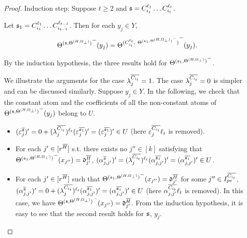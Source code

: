 \begin{appendix}
\begin{proof}
Induction step: Suppose $t \ge 2$ and ${\mathfrak{s} }=C^{\ell_1}_{i_1} \dots C^{\ell_t}_{i_t}$.

Let ${\mathfrak{s} }_1= C^{\ell_1}_{i_1} \dots C^{\ell_{t-1}}_{i_{t-1}}$.  Then for each $y_j \in Y$, 
\[{\Theta^{({\mathfrak{s} },\Theta^{(H,\Omega_\bot)})}}^-(y_j)=
{\Theta^{(C^{\ell_t}_{i_t},\ {\Theta^{({\mathfrak{s} }_1, \Theta^{(H,\Omega_\bot)})}}^-)}}^-(y_j).\] 

By the induction hypothesis, the three results hold for ${\Theta^{({\mathfrak{s} }_1, \Theta^{(H,\Omega_\bot)})}}^-$.

We illustrate the arguments for the case $\lambda^{\overline{C_{i_t}}}_{j} = 1$. The case $\lambda^{\overline{C_{i_t}}}_{j} = 0$ is simpler and can be discussed similarly. Suppose $y_j \in Y$.  In the following, we check that the constant atom and the coefficients of all the non-constant atoms of ${\Theta^{({\mathfrak{s} },\Theta^{(H,\Omega_\bot)})}}^-(y_j)$ belong to $U$.  
\begin{itemize}
	\item $(\varepsilon^{\overline{{\mathfrak{s} }}}_{j})' = 0 + (\lambda^{\overline{C_{i_t}}}_{j})^{\ell_t} (\varepsilon^{\overline{{\mathfrak{s} }_1}}_j)' = (\varepsilon^{\overline{{\mathfrak{s} }_1}}_j)' \in U$ (here $\varepsilon^{\overline{C_{i_t}}}_{j} \ell_t$ is removed).
	\item For each $j' \in [r^{\overline{H}}]$ s.t. there exists no $j'' \in [k]$ satisfying that ${\Theta^{({\mathfrak{s} }_1,\Theta^{(H,\Omega_\bot)})}}^-(x_{j''})=\mathfrak{d}^{\overline{H}}_{j'}$, $(\alpha^{\overline{{\mathfrak{s} }}}_{j, j'})' = (\lambda^{\overline{C_{i_t}}}_{j})^{\ell_t} (\alpha^{\overline{{\mathfrak{s} }_1}}_{j, j'})' = (\alpha^{\overline{{\mathfrak{s} }_1}}_{j, j'})' \in U$.
	\item For each $j' \in [r^{\overline{H}}]$ such that ${\Theta^{({\mathfrak{s} }_1,\Theta^{(H,\Omega_\bot)})}}^-(x_{j''})=\mathfrak{d}^{\overline{H}}_{j'}$ for some $j''  \in I^{\overline{C_{i_t}}}_{pe}$, $(\alpha^{\overline{{\mathfrak{s} }}}_{j, j'})' = 0 + (\lambda^{\overline{C_{i_t}}}_{j})^{\ell_t} (\alpha^{\overline{{\mathfrak{s} }_1}}_{j, j'})'= (\alpha^{\overline{{\mathfrak{s} }_1}}_{j, j'})' \in U$ (here $\alpha^{\overline{C_{i_t}}}_{j,j'} \ell_t$ is removed). In this case, we have ${\Theta^{({\mathfrak{s} },\Theta^{(H,\Omega_\bot)})}}^-(x_{j''})=\mathfrak{d}^{\overline{H}}_{j'}$. From the induction hypothesis, it is easy to see that the second result holds for ${\mathfrak{s} }$, $y_j$.

\end{itemize}
\end{proof}
\end{appendix}
